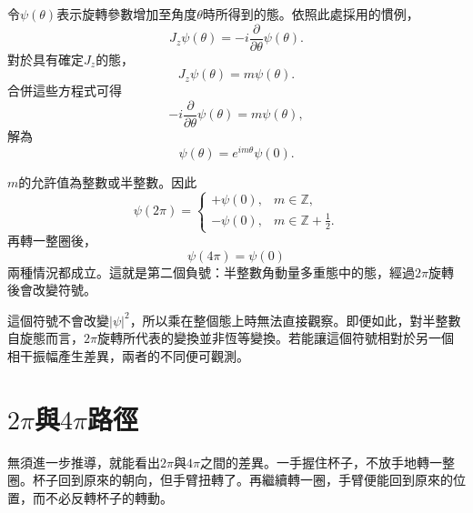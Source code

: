 \begin{classroomqa}
\end{classroomqa}


令\(\psi(\theta)\)表示旋轉參數增加至角度\(\theta\)時所得到的態。依照此處採用的慣例，
\begin{equation}
J_z\psi(\theta)
=
-i\frac{\partial}{\partial\theta}\psi(\theta).
\end{equation}
對於具有確定\(J_z\)的態，
\begin{equation}
J_z\psi(\theta)=m\psi(\theta).
\end{equation}
合併這些方程式可得
\begin{equation}
-i\frac{\partial}{\partial\theta}\psi(\theta)
=
m\psi(\theta),
\end{equation}
解為
\begin{equation}
\psi(\theta)=e^{im\theta}\psi(0).
\end{equation}

\(m\)的允許值為整數或半整數。因此
\begin{equation}
\psi(2\pi)
=
\begin{cases}
+\psi(0), & m\in\mathbb Z,\\[4pt]
-\psi(0), & m\in\mathbb Z+\tfrac12.
\end{cases}
\end{equation}
再轉一整圈後，
\begin{equation}
\psi(4\pi)=\psi(0)
\end{equation}
兩種情況都成立。這就是第二個負號：半整數角動量多重態中的態，經過\(2\pi\)旋轉後會改變符號。

這個符號不會改變\(\lvert\psi\rvert^2\)，所以乘在整個態上時無法直接觀察。即便如此，對半整數自旋態而言，\(2\pi\)旋轉所代表的變換並非恆等變換。若能讓這個符號相對於另一個相干振幅產生差異，兩者的不同便可觀測。

\section{\texorpdfstring{\(2\pi\)與\(4\pi\)}{2 pi和4 pi}路徑}

無須進一步推導，就能看出\(2\pi\)與\(4\pi\)之間的差異。一手握住杯子，不放手地轉一整圈。杯子回到原來的朝向，但手臂扭轉了。再繼續轉一圈，手臂便能回到原來的位置，而不必反轉杯子的轉動。

